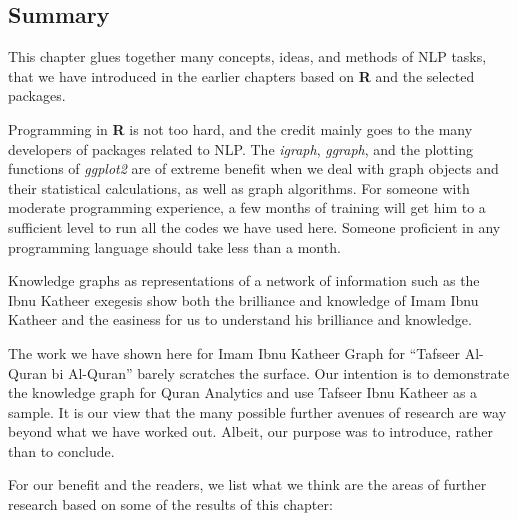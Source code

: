 \documentclass[
]{article}
\begin{document}
\hypertarget{summary-chapter-9}{%
\subsection{Summary}\label{summary-chapter-9}}

This chapter glues together many concepts, ideas, and methods of NLP tasks, that we have introduced in the earlier chapters based on \textbf{R} and the selected packages.

Programming in \textbf{R} is not too hard, and the credit mainly goes to the many developers of packages related to NLP. The \emph{igraph}, \emph{ggraph}, and the plotting functions of \emph{ggplot2} are of extreme benefit when we deal with graph objects and their statistical calculations, as well as graph algorithms. For someone with moderate programming experience, a few months of training will get him to a sufficient level to run all the codes we have used here. Someone proficient in any programming language should take less than a month.

Knowledge graphs as representations of a network of information such as the Ibnu Katheer exegesis show both the brilliance and knowledge of Imam Ibnu Katheer and the easiness for us to understand his brilliance and knowledge.

The work we have shown here for Imam Ibnu Katheer Graph for ``Tafseer Al-Quran bi Al-Quran'' barely scratches the surface. Our intention is to demonstrate the knowledge graph for Quran Analytics and use Tafseer Ibnu Katheer as a sample. It is our view that the many possible further avenues of research are way beyond what we have worked out. Albeit, our purpose was to introduce, rather than to conclude.

For our benefit and the readers, we list what we think are the areas of further research based on some of the results of this chapter:
\end{document}
